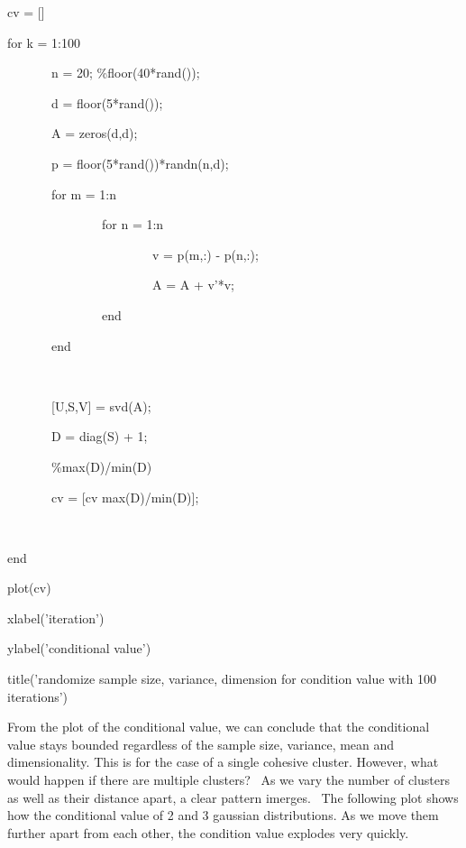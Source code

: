 \documentclass{article}
\newenvironment{tmindent}{\begin{tmparmod}{1.5em}{0pt}{0pt} }{\end{tmparmod}}
\newenvironment{tmparmod}[3]{\begin{list}{}{\setlength{\topsep}{0pt}\setlength{\leftmargin}{#1}\setlength{\rightmargin}{#2}\setlength{\parindent}{#3}\setlength{\listparindent}{\parindent}\setlength{\itemindent}{\parindent}\setlength{\parsep}{\parskip}} \item[]}{\end{list}}
\newenvironment{tmparsep}[1]{\begingroup\setlength{\parskip}{#1}}{\endgroup}
\begin{document}
{\noindent}\begin{tmindent}
  \begin{tmparsep}{0em}
    
    
    
    
    cv = []
    
    for k = 1:100
    
    \ \ \ \ \ \ \ n = 20; \%floor(40*rand());
    
    \ \ \ \ \ \ \ d = floor(5*rand());
    
    \ \ \ \ \ \ \ A = zeros(d,d);
    
    \ \ \ \ \ \ \ p = floor(5*rand())*randn(n,d);
    
    \ \ \ \ \ \ \ for m = 1:n
    
    \ \ \ \ \ \ \ \ \ \ \ \ \ \ \ for n = 1:n
    
    \ \ \ \ \ \ \ \ \ \ \ \ \ \ \ \ \ \ \ \ \ \ \ v = p(m,:) - p(n,:);
    
    \ \ \ \ \ \ \ \ \ \ \ \ \ \ \ \ \ \ \ \ \ \ \ A = A + v'*v;
    
    \ \ \ \ \ \ \ \ \ \ \ \ \ \ \ end
    
    \ \ \ \ \ \ \ end
    
    \ \ \ \ \ \ \
    
    \ \ \ \ \ \ \ [U,S,V] = svd(A);
    
    \ \ \ \ \ \ \ D = diag(S) + 1;
    
    
    
    \ \ \ \ \ \ \ \%max(D)/min(D)
    
    \ \ \ \ \ \ \ cv = [cv max(D)/min(D)];
    
    \ \ \ \ \ \ \
    
    end
    
    
    
    plot(cv)
    
    xlabel('iteration')
    
    ylabel('conditional value')
    
    title('randomize sample size, variance, dimension for condition value with
    100 iterations')
  \end{tmparsep}
\end{tmindent}{\hspace*{\fill}}{\medskip}



From the plot of the conditional value, we can conclude that the conditional
value stays bounded regardless of the sample size, variance, mean and
dimensionality. This is for the case of a single cohesive cluster. However,
what would happen if there are multiple clusters? \ As we vary the number of
clusters as well as their distance apart, a clear pattern imerges. \ The
following plot shows how the conditional value of 2 and 3 gaussian
distributions. As we move them further apart from each other, the condition
value explodes very quickly.
\end{document}
